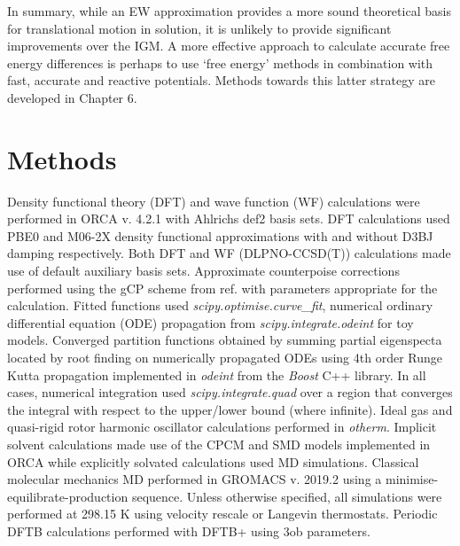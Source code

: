 \documentclass[../main.tex]{subfiles}
\begin{document}
In summary, while an EW approximation provides a more sound theoretical basis for translational motion in solution, it is unlikely to provide significant improvements over the IGM. A more effective approach to calculate accurate free energy differences is perhaps to use `free energy' methods in combination with fast, accurate and reactive potentials. Methods towards this latter strategy are developed in Chapter 6.

\section{Methods}

Density functional theory (DFT) and wave function (WF) calculations were performed in ORCA v. 4.2.1\cite{Neese2017} with Ahlrichs def2 basis sets\cite{Weigend2005}. DFT calculations used PBE0\cite{Adamo1999, Perdew1996} and M06-2X\cite{Zhao2007} density functional approximations with and without D3BJ\cite{Grimme2010, Grimme2011} damping respectively. Both DFT and WF (DLPNO-CCSD(T)\cite{Riplinger2013}) calculations made use of default auxiliary basis sets. Approximate counterpoise corrections performed using the gCP scheme from ref. \cite{Kruse2012} with parameters appropriate for the calculation. Fitted functions used \emph{scipy.optimise.curve\_fit}, numerical ordinary differential equation (ODE) propagation from  \emph{scipy.integrate.odeint} for toy models.\cite{SciPy} Converged partition functions obtained by summing partial eigenspecta located by root finding on numerically propagated ODEs using 4th order Runge Kutta\cite{Kutta1901} propagation implemented in \emph{odeint} from the \emph{Boost} C++ library.\cite{BoostODE2021} In all cases, numerical integration used \emph{scipy.integrate.quad} over a region that converges the integral with respect to the upper/lower bound (where infinite). Ideal gas and quasi-rigid rotor harmonic oscillator calculations performed in \emph{otherm}. Implicit solvent calculations made use of the CPCM\cite{Barone1998} and SMD\cite{Marenich2009} models implemented in ORCA while explicitly solvated calculations used MD simulations. Classical molecular mechanics MD performed in GROMACS v. 2019.2 using a minimise-equilibrate-production sequence.\cite{Abraham2015} Unless otherwise specified, all simulations were performed at 298.15 K using velocity rescale or Langevin thermostats. Periodic DFTB calculations performed with DFTB+\cite{Hourahine2020} using 3ob\cite{Gaus2012} parameters.

\clearpage
\end{document}
